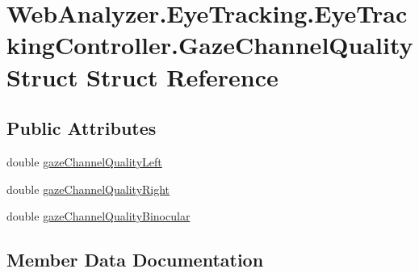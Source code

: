 \hypertarget{struct_web_analyzer_1_1_eye_tracking_1_1_eye_tracking_controller_1_1_gaze_channel_quality_struct}{}\section{Web\+Analyzer.\+Eye\+Tracking.\+Eye\+Tracking\+Controller.\+Gaze\+Channel\+Quality\+Struct Struct Reference}
\label{struct_web_analyzer_1_1_eye_tracking_1_1_eye_tracking_controller_1_1_gaze_channel_quality_struct}
\subsection*{Public Attributes}
\begin{DoxyCompactItemize}
\item 
double \hyperlink{struct_web_analyzer_1_1_eye_tracking_1_1_eye_tracking_controller_1_1_gaze_channel_quality_struct_afa5448800111088fe037c0ca42df3dcc}{gaze\+Channel\+Quality\+Left}
\item 
double \hyperlink{struct_web_analyzer_1_1_eye_tracking_1_1_eye_tracking_controller_1_1_gaze_channel_quality_struct_aecddd9ebc34deb03015fbf0aaeae7092}{gaze\+Channel\+Quality\+Right}
\item 
double \hyperlink{struct_web_analyzer_1_1_eye_tracking_1_1_eye_tracking_controller_1_1_gaze_channel_quality_struct_a9db76be67045be6fb3e79f22edb0e940}{gaze\+Channel\+Quality\+Binocular}
\end{DoxyCompactItemize}


\subsection{Member Data Documentation}
\hypertarget{struct_web_analyzer_1_1_eye_tracking_1_1_eye_tracking_controller_1_1_gaze_channel_quality_struct_a9db76be67045be6fb3e79f22edb0e940}{}
